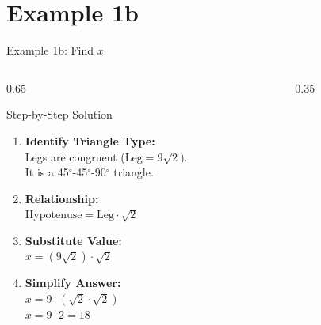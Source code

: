 \documentclass[10pt]{beamer}
\begin{document}
\section{Example 1b}
\begin{frame}{Example 1b: Find $x$}
    \begin{columns}[T]
        \begin{column}{0.65\textwidth}
            \begin{block}{Step-by-Step Solution}
                \addtolength{\itemsep}{-0.5ex} %
                \begin{enumerate}
                    \item<1-> \textbf{Identify Triangle Type:} \\
                    Legs are congruent ($\text{Leg} = 9\sqrt{2}$). \\
                    It is a 45$^\circ$-45$^\circ$-90$^\circ$ triangle.
                    
                    \item<2-> \textbf{Relationship:} \\
                    $\text{Hypotenuse} = \text{Leg} \cdot \sqrt{2}$
                    
                    \item<3-> \textbf{Substitute Value:} \\
                    $x = (9\sqrt{2}) \cdot \sqrt{2}$
                    
                    \item<4-> \textbf{Simplify Answer:} \\
                    $x = 9 \cdot (\sqrt{2} \cdot \sqrt{2})$ \\
                    $x = 9 \cdot 2 = 18$
                \end{enumerate}
            \end{block}
        \end{column}

        \begin{column}{0.35\textwidth}
            \centering
            \vspace{0.5cm}
        \end{column}
    \end{columns}
\end{frame}
\end{document}
